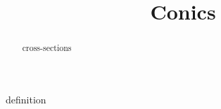 \documentclass{ximera}
\title{Conics}
\begin{document}
\begin{abstract}
cross-sections
\end{abstract}
\maketitle




definition
\end{document}
